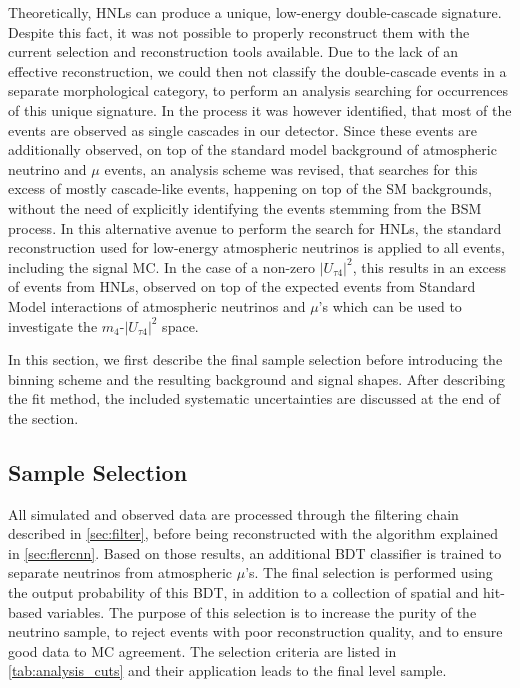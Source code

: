 \documentclass[
    aps,
    prd,
    reprint,
    amsmath,
    amssymb,
    nofootinbib,
    linenumbers,
    superscriptaddress,
    floatfix
]{revtex4-2}
\def\ut4{$|U_{\tau4}|^2$}
\begin{document}
Theoretically, HNLs can produce a unique, low-energy double-cascade signature. Despite this fact, it was not possible to properly reconstruct them with the current selection and reconstruction tools available. Due to the lack of an effective reconstruction, we could then not classify the double-cascade events in a separate morphological category, to perform an analysis searching for occurrences of this unique signature. In the process it was however identified, that most of the events are observed as single cascades in our detector. Since these events are additionally observed, on top of the standard model background of atmospheric neutrino and $\mu$ events, an analysis scheme was revised, that searches for this excess of mostly cascade-like events, happening on top of the SM backgrounds, without the need of explicitly identifying the events stemming from the BSM process. In this alternative avenue to perform the search for HNLs, the standard reconstruction used for low-energy atmospheric neutrinos is applied to all events, including the signal MC. In the case of a non-zero \ut4, this results in an excess of events from HNLs, observed on top of the expected events from Standard Model interactions of atmospheric neutrinos and $\mu$'s which can be used to investigate the $m_4$-\ut4 space.

In this section, we first describe the final sample selection before introducing the binning scheme and the resulting background and signal shapes. After describing the fit method, the included systematic uncertainties are discussed at the end of the section.


\subsection{\label{sec:sample}Sample Selection}

All simulated and observed data are processed through the filtering chain described in \cref{sec:filter}, before being reconstructed with the algorithm explained in \cref{sec:flercnn}.
Based on those results, an additional BDT classifier is trained to separate neutrinos from atmospheric $\mu$'s.
The final selection is performed using the output probability of this BDT, in addition to a collection of spatial and hit-based variables.
The purpose of this selection is to increase the purity of the neutrino sample, to reject events with poor reconstruction quality, and to ensure good data to MC agreement.
The selection criteria are listed in \cref{tab:analysis_cuts} and their application leads to the final level sample.
\end{document}
